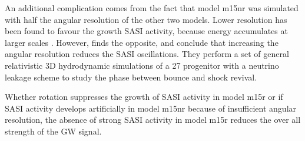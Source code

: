 An additional complication comes from the fact that model m15nr was simulated with 
half the angular resolution of the other two models. Lower resolution has been found
to favour the growth SASI activity, because energy accumulates at larger scales \citep{hanke_12}.
However, \cite{abdikamalov_15} finds the opposite, and conclude that increasing the angular resolution 
reduces the SASI oscillations. They perform a set of general relativistic 3D hydrodynamic
simulations of a 27 \msun progenitor with a neutrino leakage scheme to study the phase between bounce and
shock revival.

Whether rotation suppresses the growth of SASI activity in model m15r or if SASI activity develops
artificially in model m15nr because of insufficient angular resolution, the absence of strong SASI activity in model
m15r reduces the over all strength of the GW signal. 

